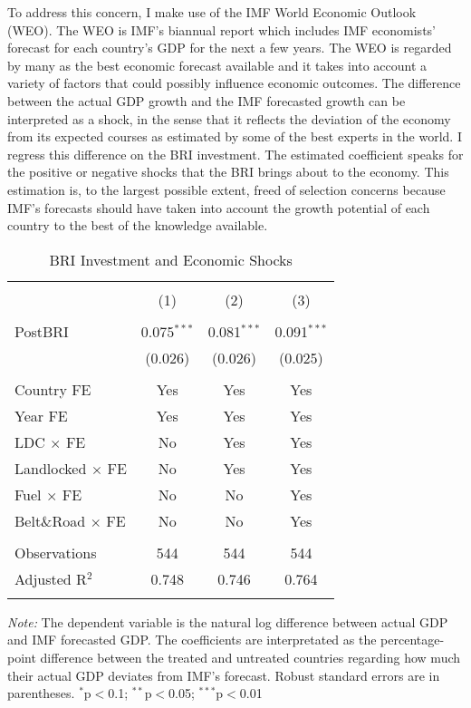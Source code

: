 \documentclass[10pt,a4paper]{article}
\begin{document}
To address this concern, I make use of the IMF World Economic Outlook
(WEO). The WEO is IMF's biannual report which includes IMF economists'
forecast for each country's GDP for the next a few years. The WEO is
regarded by many as the best economic forecast available and it takes
into account a variety of factors that could possibly influence economic
outcomes. The difference between the actual GDP growth and the IMF
forecasted growth can be interpreted as a shock, in the sense that it
reflects the deviation of the economy from its expected courses as
estimated by some of the best experts in the world. I regress this
difference on the BRI investment. The estimated coefficient speaks for
the positive or negative shocks that the BRI brings about to the
economy. This estimation is, to the largest possible extent, freed of
selection concerns because IMF's forecasts should have taken into
account the growth potential of each country to the best of the
knowledge available.
\begin{table}[!htbp] \centering
  \caption{{BRI Investment and Economic Shocks}}
  \label{tab:shocks}
\begin{tabular}{@{\extracolsep{5pt}}lccc}
\\[-1.8ex]\hline
\hline \\[-1.8ex]

 & (1) & (2) & (3)\\
\hline \\[-1.8ex]

 PostBRI & 0.075$^{***}$ & 0.081$^{***}$ & 0.091$^{***}$ \\
  & (0.026) & (0.026) & (0.025) \\
  & & & \\

Country FE & Yes & Yes & Yes \\
Year FE & Yes & Yes & Yes \\
LDC $\times$ FE & No & Yes & Yes \\
Landlocked $\times$ FE & No & Yes & Yes \\
Fuel $\times$ FE & No & No & Yes \\
Belt\&Road $\times$ FE & No & No & Yes \\

\hline \\[-1.8ex]
Observations & 544 & 544 & 544 \\
Adjusted R$^{2}$ & 0.748 & 0.746 & 0.764 \\
\hline
\hline \\[-1.8ex]

\end{tabular}

\begin{flushleft}
\textit{Note:}
The dependent variable is the natural log difference between
actual GDP and IMF forecasted GDP.
The coefficients are interpretated as the percentage-point difference between the treated and untreated countries regarding how much their actual GDP deviates from IMF's forecast.
Robust standard errors are in parentheses.
$^{*}$p$<$0.1; $^{**}$p$<$0.05; $^{***}$p$<$0.01
\end{flushleft}

\end{table}
\end{document}
